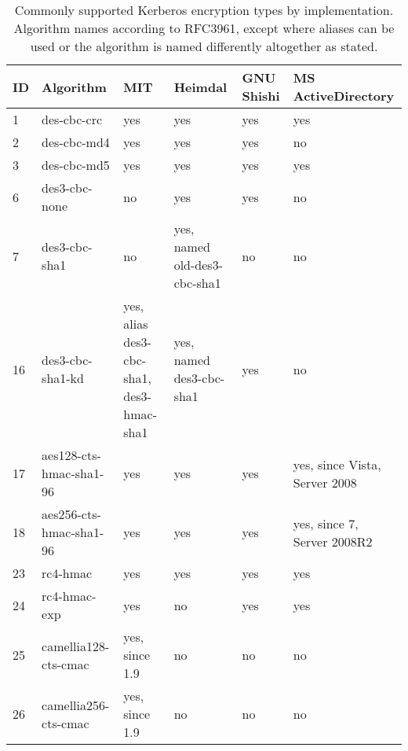 
\begin{table}[h]
	\centering
	\small
	\begin{tabular}{ll|llll}
		\toprule
		ID & Algorithm & MIT & Heimdal & GNU Shishi & MS ActiveDirectory \\
		\midrule
		1  & des-cbc-crc             & yes            & yes & yes & yes \\
		2  & des-cbc-md4             & yes            & yes & yes & no  \\
		3  & des-cbc-md5             & yes            & yes & yes & yes \\
		6  & des3-cbc-none           & no             & yes & yes & no  \\
		7  & des3-cbc-sha1           & no             & yes, {\tiny named old-des3-cbc-sha1} & no  & no  \\
		16 & des3-cbc-sha1-kd & yes, {\tiny alias des3-cbc-sha1, des3-hmac-sha1} & yes, {\tiny named des3-cbc-sha1} & yes & no  \\
		17 & aes128-cts-hmac-sha1-96 & yes            & yes & yes & yes, {\tiny since Vista, Server 2008} \\
		18 & aes256-cts-hmac-sha1-96 & yes            & yes & yes & yes, {\tiny since 7, Server 2008R2} \\
		23 & rc4-hmac                & yes            & yes & yes & yes \\
		24 & rc4-hmac-exp            & yes            & no  & yes & yes \\
		25 & camellia128-cts-cmac    & yes, since 1.9 & no  & no  & no  \\
		26 & camellia256-cts-cmac    & yes, since 1.9 & no  & no  & no  \\
		\bottomrule
	\end{tabular}
	\caption{Commonly supported Kerberos encryption types by implementation. Algorithm names according to RFC3961, except where aliases can be used or the algorithm is named differently altogether as stated.}
	\label{tab:Kerberos_enctypes}
\end{table}
